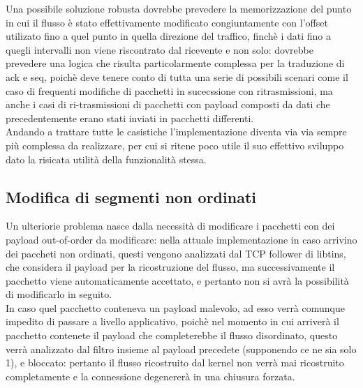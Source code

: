 Una possibile soluzione robusta dovrebbe prevedere la memorizzazione del punto in cui il flusso è stato effettivamente modificato congiuntamente con l'offset utilizato fino
a quel punto in quella direzione del traffico, finchè i dati fino a quegli intervalli non viene riscontrato dal ricevente e non solo:
dovrebbe prevedere una logica che risulta particolarmente complessa per la traduzione di ack e seq, poichè deve tenere conto di tutta una serie di possibili scenari
come il caso di frequenti modifiche di pacchetti in sucecssione con ritrasmissioni, ma anche i casi di ri-trasmissioni di pacchetti con payload composti da dati
che precedentemente erano stati inviati in pacchetti differenti.\\
Andando a trattare tutte le casistiche l'implementazione diventa via via sempre più complessa da realizzare, per cui si ritene poco utile
il suo effettivo sviluppo dato la risicata utilità della funzionalità stessa.

\subsection{Modifica di segmenti non ordinati}

Un ulteriorie problema nasce dalla necessità di modificare i pacchetti con dei payload out-of-order da modificare:
nella attuale implementazione in caso arrivino dei paccheti non ordinati, questi vengono analizzati dal TCP follower di libtins, che considera il payload per
la ricostruzione del flusso, ma successivamente il pacchetto viene automaticamente accettato, e pertanto non si avrà la possibilità di modificarlo in seguito.\\
In caso quel pacchetto conteneva un payload malevolo, ad esso verrà comunque impedito di passare a livello applicativo, poichè nel momento in cui arriverà
il pacchetto contenete il payload che completerebbe il flusso disordinato, questo verrà analizzato dal filtro insieme al payload precedete (supponendo ce ne sia solo 1),
e bloccato: pertanto il flusso ricostruito dal kernel non verrà mai ricostruito completamente e la connessione degenererà in una chiusura forzata.\\

